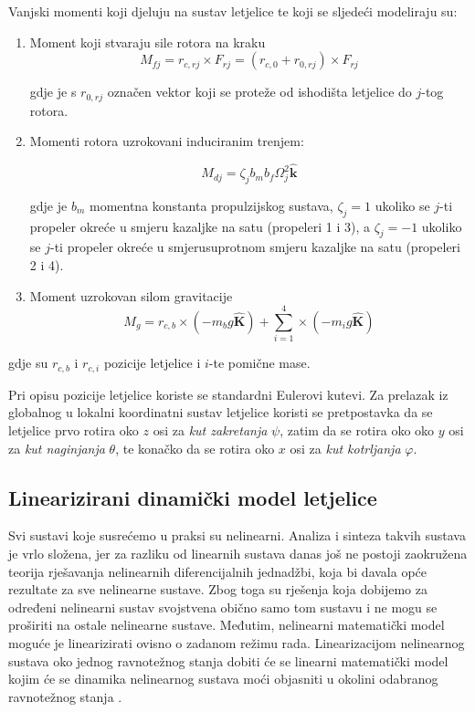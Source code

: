 \documentclass[11pt,a4paper]{article}
\begin{document}
Vanjski momenti koji djeluju na sustav letjelice te koji se sljedeći modeliraju su:
\begin{enumerate}
\item Moment koji stvaraju sile rotora na kraku
\begin{equation}
M_{fj} = r_{c,rj} \times F_{rj} = (r_{c,0} + r_{0,rj}) \times F_{rj}
\label{eq:Mfj}
\end{equation}

gdje je s $r_{0,rj}$ označen vektor koji se proteže od ishodišta letjelice do $j$-tog rotora.

\item Momenti rotora uzrokovani induciranim trenjem:

\begin{equation}
M_{dj} = \zeta_{j}b_{m}b_{f}\Omega_{j}^{2} \bm{\hat{k}}
\label{eq:Mdj}
\end{equation}

gdje je $b_{m}$ momentna konstanta propulzijskog sustava, $\zeta_{j} =  1$ ukoliko se $j$-ti propeler okreće u smjeru kazaljke na satu (propeleri 1 i 3), a $\zeta_{j} =  -1$ ukoliko se $j$-ti propeler okreće u smjerusuprotnom smjeru kazaljke na satu (propeleri 2 i 4).

\item Moment uzrokovan silom gravitacije
\begin{equation}
M_{g} = r_{c,b} \times (-m_{b}g \bm{\hat{K}}) + \sum_{i=1}^{4} \times (-m_{i}g \bm{\hat{K}})
\label{eq:Mg}
\end{equation}
\end{enumerate}

gdje su $r_{c,b}$ i $r_{c,i}$ pozicije letjelice i $i$-te pomične mase.

Pri opisu pozicije letjelice koriste se standardni Eulerovi kutevi. Za prelazak iz globalnog u lokalni koordinatni sustav letjelice koristi se pretpostavka da se letjelice prvo rotira oko $z$ osi za \textit{kut zakretanja} $\psi$, zatim da se rotira oko oko $y$ osi za \textit{kut naginjanja} $\theta$, te konačko da se rotira oko $x$ osi za \textit{kut kotrljanja} $\varphi$.



\subsection{Linearizirani dinamički model letjelice}

Svi sustavi koje susrećemo u praksi su nelinearni. Analiza i sinteza takvih sustava je vrlo složena, jer za razliku od linearnih sustava danas još ne postoji zaokružena teorija rješavanja nelinearnih diferencijalnih jednadžbi, koja bi davala opće rezultate za sve nelinearne sustave. Zbog toga su rješenja koja dobijemo za određeni nelinearni sustav svojstvena obično samo tom sustavu i ne mogu se proširiti na ostale nelinearne sustave. Međutim, nelinearni matematički model moguće je linearizirati ovisno o zadanom režimu rada. Linearizacijom nelinearnog sustava oko jednog ravnotežnog stanja dobiti će se linearni matematički model kojim će se dinamika nelinearnog sustava moći objasniti u okolini odabranog ravnotežnog stanja \cite{vukic}.
\end{document}
